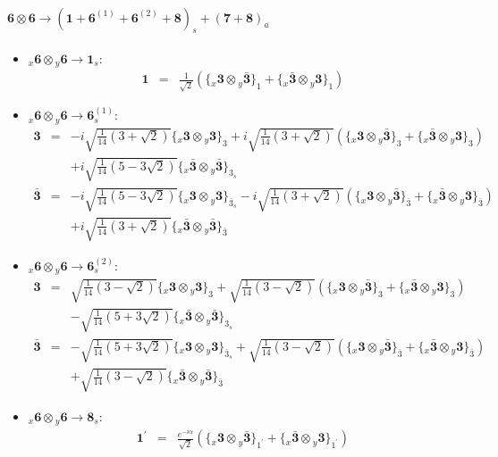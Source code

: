 \documentclass[english]{article}
\newcommand{\rep}[1]{\mathbf{#1}}
\newcommand{\repx}[2]{{}_{#2}\mathbf{#1}}
\newcommand{\subcg}[3]{\big\{ \repx{#1}{x}\otimes\repx{#2}{y}\big\}^{}_{#3}}
\begin{document}
\paragraph*{\Large $\rep{6}\otimes\rep{6}\to\left(\rep{1}+\rep{6}^{(1)}+\rep{6}^{(2)}+\rep{8}\right)_s+\left(\rep{7}+\rep{8}\right)_a$}
\begin{itemize}
\item $\repx{6}{x}\otimes\repx{6}{y}\to\rep{1}_{s}$:
\begin{eqnarray*}
\rep{1} &=& \frac{1}{\sqrt{2}}\left(\subcg{3}{\bar{3}}{1}+\subcg{\bar{3}}{3}{1}\right)
\end{eqnarray*}
\item $\repx{6}{x}\otimes\repx{6}{y}\to\rep{6}_{s}^{(1)}$:
\begin{eqnarray*}
\rep{3} &=& -i \sqrt{\frac{1}{14} \left(3+\sqrt{2}\right)}\subcg{3}{3}{3}+i \sqrt{\frac{1}{14} \left(3+\sqrt{2}\right)}\left(\subcg{3}{\bar{3}}{3}+\subcg{\bar{3}}{3}{3}\right) \\ 
 & & +i \sqrt{\frac{1}{14} \left(5-3 \sqrt{2}\right)}\subcg{\bar{3}}{\bar{3}}{3_{s}}
\\
\rep{\bar{3}} &=& -i \sqrt{\frac{1}{14} \left(5-3 \sqrt{2}\right)}\subcg{3}{3}{\bar{3}_{s}}-i \sqrt{\frac{1}{14} \left(3+\sqrt{2}\right)}\left(\subcg{3}{\bar{3}}{\bar{3}}+\subcg{\bar{3}}{3}{\bar{3}}\right) \\ 
 & & +i \sqrt{\frac{1}{14} \left(3+\sqrt{2}\right)}\subcg{\bar{3}}{\bar{3}}{\bar{3}}
\end{eqnarray*}
\item $\repx{6}{x}\otimes\repx{6}{y}\to\rep{6}_{s}^{(2)}$:
\begin{eqnarray*}
\rep{3} &=& \sqrt{\frac{1}{14} \left(3-\sqrt{2}\right)}\subcg{3}{3}{3}+\sqrt{\frac{1}{14} \left(3-\sqrt{2}\right)}\left(\subcg{3}{\bar{3}}{3}+\subcg{\bar{3}}{3}{3}\right) \\ 
 & & -\sqrt{\frac{1}{14} \left(5+3 \sqrt{2}\right)}\subcg{\bar{3}}{\bar{3}}{3_{s}}
\\
\rep{\bar{3}} &=& -\sqrt{\frac{1}{14} \left(5+3 \sqrt{2}\right)}\subcg{3}{3}{\bar{3}_{s}}+\sqrt{\frac{1}{14} \left(3-\sqrt{2}\right)}\left(\subcg{3}{\bar{3}}{\bar{3}}+\subcg{\bar{3}}{3}{\bar{3}}\right) \\ 
 & & +\sqrt{\frac{1}{14} \left(3-\sqrt{2}\right)}\subcg{\bar{3}}{\bar{3}}{\bar{3}}
\end{eqnarray*}
\item $\repx{6}{x}\otimes\repx{6}{y}\to\rep{8}_{s}$:
\begin{eqnarray*}
\rep{1^{\prime}} &=& \frac{e^{-i \alpha }}{\sqrt{2}}\left(\subcg{3}{\bar{3}}{1^{\prime}}+\subcg{\bar{3}}{3}{1^{\prime}}\right)

\end{eqnarray*}
\end{itemize}
\end{document}
